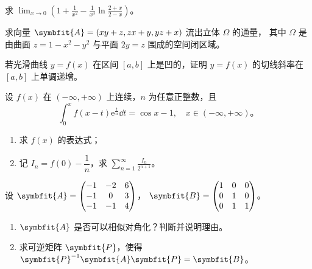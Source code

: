 \begin{question}[index=17,points=10]
求 $\displaystyle\lim_{x\to 0}\left(1+\frac{1}{x^2}-\frac{1}{x^3}\ln\frac{2+x}{2-x}\right)$。
\end{question}
\QuestionBreak\WorkSpace

\begin{question}[index=18,points=12]
求向量 $\symbfit{A}=(xy+z,zx+y,yz+x)$ 流出立体 $\Omega$ 的通量，
其中 $\Omega$ 是由曲面 $z=1-x^2-y^2$ 与平面 $2y=z$ 围成的空间闭区域。
\end{question}
\QuestionBreak\WorkSpace\WorkPageBreak

\begin{question}[index=19,points=12]
若光滑曲线 $y=f(x)$ 在区间 $[a,b]$ 上是凹的，证明 $y=f(x)$ 的切线斜率在 $[a,b]$ 上单调递增。
\end{question}
\QuestionBreak\WorkSpace

\begin{question}[index=20,points=12]
设 $f(x)$ 在 $(-\infty,+\infty)$ 上连续，$n$ 为任意正整数，且
\[
\int_0^x f(x-t)\mathrm e^{\frac{t}{n}}\dd t=\cos x-1,\quad x\in(-\infty,+\infty)\text{。}
\]
\begin{enumerate}[label=（\arabic*）,leftmargin=2.5em,labelsep=.4em,itemsep=3pt,topsep=3pt]
\item 求 $f(x)$ 的表达式；
\item 记 $I_n=f(0)-\dfrac{1}{n}$，求 $\displaystyle\sum_{n=1}^{\infty}\frac{I_n}{2^{n+1}}$。
\end{enumerate}
\end{question}
\QuestionBreak\WorkSpace\WorkPageBreak

\begin{question}[index=21,points=12]
设
$\symbfit{A}=\begin{pmatrix}-1&-2&6\\-1&0&3\\-1&-1&4\end{pmatrix}$，
$\symbfit{B}=\begin{pmatrix}1&0&0\\0&1&0\\0&1&1\end{pmatrix}$。
\begin{enumerate}[label=（\arabic*）,leftmargin=2.5em,labelsep=.4em,itemsep=3pt,topsep=3pt]
\item $\symbfit{A}$ 是否可以相似对角化？判断并说明理由。
\item 求可逆矩阵 $\symbfit{P}$，使得 $\symbfit{P}^{-1}\symbfit{A}\symbfit{P}=\symbfit{B}$。
\end{enumerate}
\end{question}
\QuestionBreak\WorkSpace


